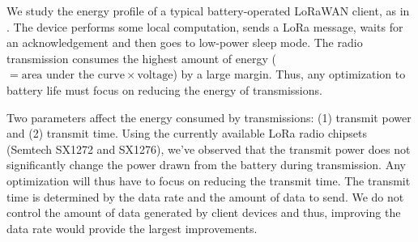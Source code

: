 
We study the energy profile of a typical battery-operated LoRaWAN client, as
in . The device performs some local computation, sends a
LoRa message, waits for an acknowledgement and then goes to low-power sleep
mode. The radio transmission consumes the highest amount of energy ($=
\text{area under the curve} \times \text{voltage}$) by a large margin. Thus,
any optimization to battery life must focus on reducing the energy of
transmissions.

Two parameters affect the energy consumed by transmissions: (1) transmit power
and (2) transmit time. Using the currently available LoRa radio chipsets
(Semtech SX1272 and SX1276), we've observed that the transmit power does not
significantly change the power drawn from the battery during transmission. Any
optimization will thus have to focus on reducing the transmit time. The
transmit time is determined by the data rate and the amount of data to send.
We do not control the amount of data generated by client devices and thus,
improving the data rate would provide the largest improvements.

